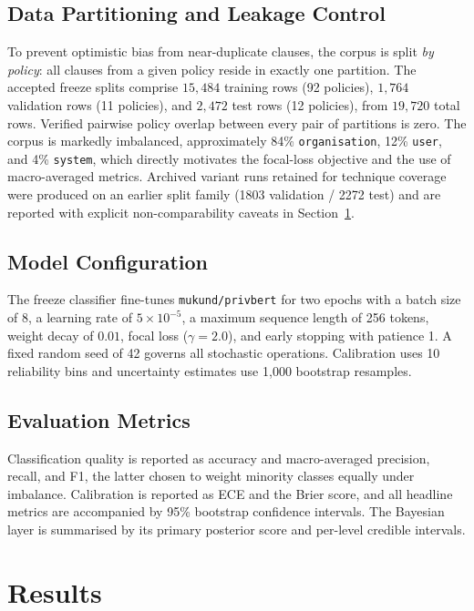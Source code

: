 \documentclass[conference]{IEEEtran}
\begin{document}
\subsection{Data Partitioning and Leakage Control}
To prevent optimistic bias from near-duplicate clauses, the corpus is split
\emph{by policy}: all clauses from a given policy reside in exactly one
partition. The accepted freeze splits comprise $15{,}484$ training rows (92
policies), $1{,}764$ validation rows (11 policies), and $2{,}472$ test rows
(12 policies), from $19{,}720$ total rows. Verified pairwise policy overlap between every pair of
partitions is zero. The corpus is markedly imbalanced, approximately 84\%
\texttt{organisation}, 12\% \texttt{user}, and 4\% \texttt{system}, which
directly motivates the focal-loss objective and the use of macro-averaged
metrics. Archived variant runs retained for technique coverage were produced
on an earlier split family (1803 validation / 2272 test) and are reported
with explicit non-comparability caveats in Section~\ref{sec:results}.

\subsection{Model Configuration}
The freeze classifier fine-tunes \texttt{mukund/privbert} for two epochs with
a batch size of 8, a learning rate of $5\times10^{-5}$, a maximum sequence
length of 256 tokens, weight decay of $0.01$, focal loss ($\gamma = 2.0$),
and early stopping with patience 1. A fixed random seed of 42 governs all
stochastic operations. Calibration uses 10 reliability bins and uncertainty
estimates use 1{,}000 bootstrap resamples.

\subsection{Evaluation Metrics}
Classification quality is reported as accuracy and macro-averaged precision,
recall, and F1, the latter chosen to weight minority classes equally under
imbalance. Calibration is reported as ECE and the Brier score, and all
headline metrics are accompanied by 95\% bootstrap confidence intervals. The
Bayesian layer is summarised by its primary posterior score and per-level
credible intervals.

\section{Results}\label{sec:results}
\end{document}
